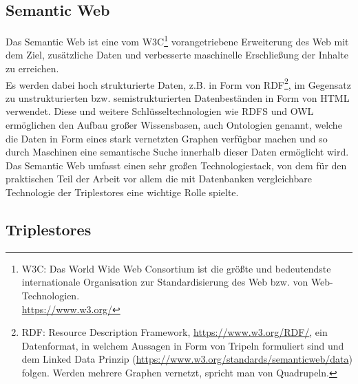 \documentclass{article}
\begin{document}
\subsection{Semantic Web}

Das Semantic Web ist eine vom W3C\footnote{W3C: Das World Wide Web Consortium ist die größte und bedeutendste internationale Organisation zur Standardisierung des Web bzw. von Web-Technologien.\\ \url{https://www.w3.org/} } vorangetriebene Erweiterung des Web mit dem Ziel, zusätzliche Daten und verbesserte maschinelle Erschließung der Inhalte zu erreichen.\\

Es werden dabei hoch strukturierte Daten, z.B. in Form von RDF\footnote{RDF: Resource Description Framework, \url{https://www.w3.org/RDF/}, ein Datenformat, in welchem Aussagen in Form von Tripeln formuliert sind und dem Linked Data Prinzip (\url{https://www.w3.org/standards/semanticweb/data}) folgen. Werden mehrere Graphen vernetzt, spricht man von Quadrupeln.}, im Gegensatz zu unstrukturierten bzw. semistrukturierten Datenbeständen in Form von HTML verwendet. Diese und weitere Schlüsseltechnologien wie RDFS und OWL ermöglichen den Aufbau großer Wissensbasen, auch Ontologien genannt, welche die Daten in Form eines stark vernetzten Graphen verfügbar machen und so durch Maschinen eine semantische Suche innerhalb dieser Daten ermöglicht wird.\\
Das Semantic Web umfasst einen sehr großen Technologiestack, von dem für den praktischen Teil der Arbeit vor allem die mit Datenbanken vergleichbare Technologie der Triplestores eine wichtige Rolle spielte.

\subsection{Triplestores}
\end{document}
